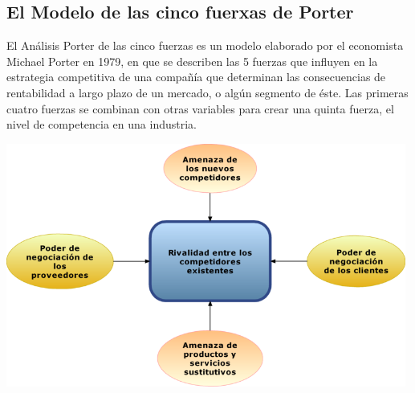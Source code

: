 \subsection*{El Modelo de las cinco fuerxas de Porter}

El Análisis Porter de las cinco fuerzas es un modelo elaborado por el economista Michael Porter en 1979,
en que se describen las 5 fuerzas que influyen en la estrategia competitiva de una compañía que determinan
las consecuencias de rentabilidad a largo plazo de un mercado, o algún segmento de éste. Las primeras cuatro
fuerzas se combinan con otras variables para crear una quinta fuerza, el nivel de competencia en una industria.

\includegraphics[height=8cm]{images/cincoFuerzas}

